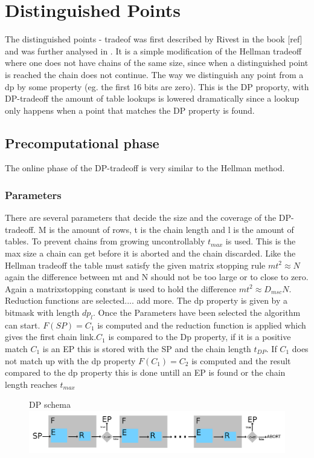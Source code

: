 \section{Distinguished Points}
\label{sec:dptheory}

The distinguished points - tradeof was first described by Rivest in
the book [ref] and was further analysed in \cite{DP}. It is a simple modification of the Hellman tradeoff
where one does not have chains of the same size, since when a
distinguished point is reached the chain does not continue. The way we distinguish any point from a dp by some property (eg. the first 16 bits are zero). This is the DP proporty, with DP-tradeoff the amount of table lookups is lowered dramatically since a lookup only happens when a point that matches the DP property is found.
\subsection{Precomputational phase}
The online phase of the DP-tradeoff is very similar to the Hellman method.
\subsubsection{Parameters}
There are several parameters that decide the size and the coverage of
the DP-tradeoff. M is the amount of rows, t is the chain length  and l is the amount of tables.
To prevent chains from growing uncontrollably $t_{max}$ is used. This is the max size a chain can get before it is aborted and the chain discarded.
Like the Hellman tradeoff the table must satisfy the
given matrix stopping rule $mt^2\approx N$ again the difference between
mt and N should not be too large or to close to zero. Again a
matrixstopping constant is used to hold the difference $mt^2\approx
D_{msc}N$. Reduction functions are selected.... add more. The dp property is given by a bitmask with length $dp_l$.
Once the Parameters have been selected the algorithm can start. $F(SP)=C_1$ is computed and the reduction function is applied which gives the first chain link.$C_1$ is compared to the Dp property, if it is a positive match $C_1$ is an EP this is stored with the SP and the chain length $t_{DP}$. If $C_1$ does not match up with the dp property $F(C_1)=C_2$ is computed and the result compared to the dp property this is done untill an EP is found or the chain length reaches $t_{max}$


\begin{figure}[th]
  DP schema
  \includegraphics[width=\textwidth]{figures/DPSchema.png}
  \centering
\end{figure}

